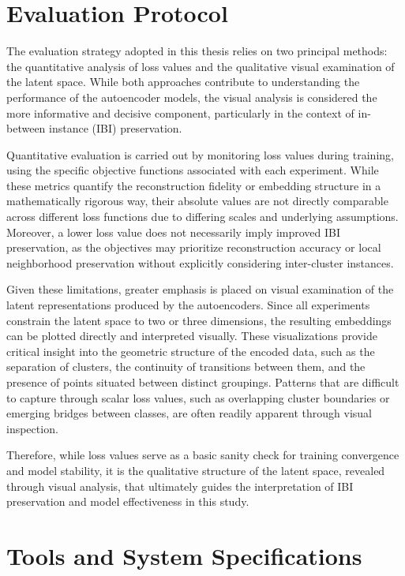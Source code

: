 \section{Evaluation Protocol}

The evaluation strategy adopted in this thesis relies on two principal methods: the quantitative analysis of loss values and the qualitative visual examination of the latent space. While both approaches contribute to understanding the performance of the autoencoder models, the visual analysis is considered the more informative and decisive component, particularly in the context of in-between instance (IBI) preservation.

Quantitative evaluation is carried out by monitoring loss values during training, using the specific objective functions associated with each experiment. While these metrics quantify the reconstruction fidelity or embedding structure in a mathematically rigorous way, their absolute values are not directly comparable across different loss functions due to differing scales and underlying assumptions. Moreover, a lower loss value does not necessarily imply improved IBI preservation, as the objectives may prioritize reconstruction accuracy or local neighborhood preservation without explicitly considering inter-cluster instances.

Given these limitations, greater emphasis is placed on visual examination of the latent representations produced by the autoencoders. Since all experiments constrain the latent space to two or three dimensions, the resulting embeddings can be plotted directly and interpreted visually. These visualizations provide critical insight into the geometric structure of the encoded data, such as the separation of clusters, the continuity of transitions between them, and the presence of points situated between distinct groupings. Patterns that are difficult to capture through scalar loss values, such as overlapping cluster boundaries or emerging bridges between classes, are often readily apparent through visual inspection.

Therefore, while loss values serve as a basic sanity check for training convergence and model stability, it is the qualitative structure of the latent space, revealed through visual analysis, that ultimately guides the interpretation of IBI preservation and model effectiveness in this study.

\section{Tools and System Specifications}

